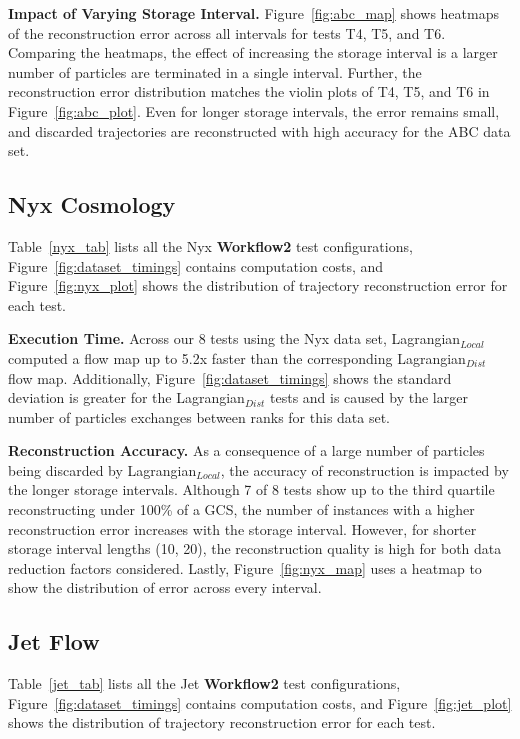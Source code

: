 \textbf{Impact of Varying Storage Interval.} Figure~\ref{fig:abc_map} shows heatmaps of the reconstruction error across all intervals for tests T4, T5, and T6.
%
Comparing the heatmaps, the effect of increasing the storage interval is a larger number of particles are terminated in a single interval. 
%
Further, the reconstruction error distribution matches the violin plots of T4, T5, and T6 in Figure~\ref{fig:abc_plot}. 
%
Even for longer storage intervals, the error remains small, and discarded trajectories are reconstructed with high accuracy for the ABC data set.

\subsection{Nyx Cosmology}
\label{sec:nyx}
Table~\ref{nyx_tab} lists all the Nyx \textbf{Workflow2} test configurations, Figure~\ref{fig:dataset_timings} contains computation costs, and Figure~\ref{fig:nyx_plot} shows the distribution of trajectory reconstruction error for each test.
%


\textbf{Execution Time.} Across our 8 tests using the Nyx data set, Lagrangian$_{Local}$ computed a flow map up to 5.2x faster than the corresponding Lagrangian$_{Dist}$ flow map.
%
Additionally, Figure~\ref{fig:dataset_timings} shows the standard deviation is greater for the Lagrangian$_{Dist}$ tests and is caused by the larger number of particles exchanges between ranks for this data set.
%

\textbf{Reconstruction Accuracy.} As a consequence of a large number of particles being discarded by Lagrangian$_{Local}$, the accuracy of reconstruction is impacted by the longer storage intervals.
%
Although 7 of 8 tests show up to the third quartile reconstructing under 100\% of a GCS, the number of instances with a higher reconstruction error increases with the storage interval.
%
However, for shorter storage interval lengths (10, 20), the reconstruction quality is high for both data reduction factors considered. 
%
Lastly, Figure~\ref{fig:nyx_map} uses a heatmap to show the distribution of error across every interval. 




\subsection{Jet Flow}
\label{sec:jet}
Table~\ref{jet_tab} lists all the Jet \textbf{Workflow2} test configurations, Figure~\ref{fig:dataset_timings} contains computation costs, and Figure~\ref{fig:jet_plot} shows the distribution of trajectory reconstruction error for each test.
%


